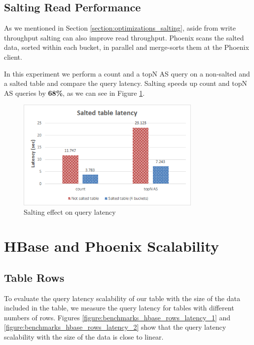 \bigskip

\subsection{Salting Read Performance}\label{subsection:benchmarks_hbase_salting}

As we mentioned in Section \ref{section:optimizations_salting}, aside from write throughput salting can also improve read throughput. Phoenix scans the salted data, sorted within each bucket, in parallel and merge-sorts them at the Phoenix client.

In this experiment we perform a count and a topN AS query on a non-salted and a salted table and compare the query latency. Salting speeds up count and topN AS queries by \textbf{68\%}, as we can see in Figure \ref{figure:benchmarks_hbase_salting_latency}.

\begin{figure}[H]
\centering
\includegraphics[width=0.8\textwidth]{figures/benchmarks_hbase_salting_latency}
\caption{Salting effect on query latency}
\label{figure:benchmarks_hbase_salting_latency}
\end{figure}


\section{HBase and Phoenix Scalability}

\subsection{Table Rows}

To evaluate the query latency scalability of our table with the size of the data included in the table, we measure the query latency for tables with different numbers of rows. Figures \ref{figure:benchmarks_hbase_rows_latency_1} and \ref{figure:benchmarks_hbase_rows_latency_2} show that the query latency scalability with the size of the data is close to linear.

